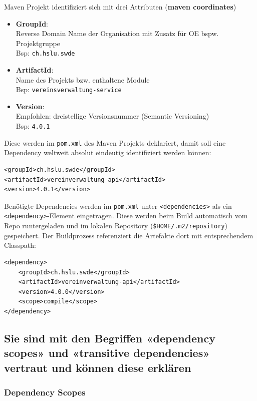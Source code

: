 \documentclass[a4paper]{article}
\begin{document}
		Maven Projekt identifiziert sich mit drei Attributen (\textbf{maven coordinates})
		\begin{itemize}
			\item \textbf{GroupId}:\\
					Reverse Domain Name der Organisation mit Zusatz für OE bspw. Projektgruppe\\
					Bsp: \texttt{ch.hslu.swde}
					
			\item \textbf{ArtifactId}:\\
					Name des Projekts bzw. enthaltene Module\\
					Bsp: \texttt{vereinsverwaltung-service}
					
			\item \textbf{Version}:\\
					Empfohlen: dreistellige Versionsnummer (Semantic Versioning)\\
					Bsp: \texttt{4.0.1}
		\end{itemize}
	Diese werden im \texttt{pom.xml} des Maven Projekts deklariert, damit soll eine Dependency weltweit absolut eindeutig identifiziert werden können:
	\begin{lstlisting}
<groupId>ch.hslu.swde</groupId>
<artifactId>vereinverwaltung-api</artifactId>
<version>4.0.1</version>
	\end{lstlisting}
	\noindent
	Benötigte Dependencies werden im \texttt{pom.xml} unter \texttt{<dependencies>} als ein \texttt{<dependency>}-Element eingetragen. 
	Diese werden beim Build automatisch vom Repo runtergeladen und im lokalen Repository (\texttt{\$HOME/.m2/repository}) gespeichert.
	Der Buildprozess referenziert die Artefakte dort mit entsprechendem Classpath:
	\begin{lstlisting}
<dependency>
	<groupId>ch.hslu.swde</groupId>
	<artifactId>vereinverwaltung-api</artifactId>
	<version>4.0.0</version>
	<scope>compile</scope>
</dependency>
	\end{lstlisting}
	
	\newpage
	
	\subsection{Sie sind mit den Begriffen «dependency scopes» und «transitive dependencies» vertraut und können diese erklären}
	
		\subsubsection{Dependency Scopes}
		
\end{document}

